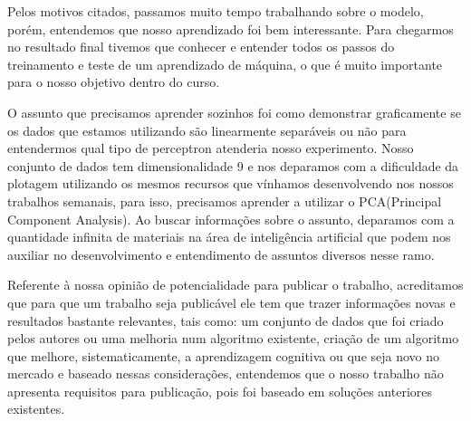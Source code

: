 \documentclass[conference]{IEEEtran}
\begin{document}
  Pelos motivos citados, passamos muito tempo trabalhando sobre o modelo, porém, entendemos que nosso aprendizado foi bem interessante. Para chegarmos no resultado final tivemos que conhecer e entender todos os passos do treinamento e teste de um aprendizado de máquina, o que é muito importante para o nosso objetivo dentro do curso.
 
    
    O assunto que precisamos aprender sozinhos foi como demonstrar graficamente se os dados que estamos utilizando são linearmente separáveis ou não para entendermos qual tipo de perceptron atenderia nosso experimento. Nosso conjunto de dados tem dimensionalidade 9 e nos deparamos com a dificuldade da plotagem utilizando os mesmos recursos que vínhamos desenvolvendo nos nossos trabalhos semanais, para isso, precisamos aprender a utilizar o PCA(Principal Component Analysis). Ao buscar informações sobre o assunto, deparamos com a quantidade infinita de materiais na área de inteligência artificial que podem nos auxiliar no desenvolvimento e entendimento de assuntos diversos nesse ramo.
    
    Referente à nossa opinião de potencialidade para publicar o trabalho, acreditamos que para que um trabalho seja publicável ele tem que trazer informações novas e resultados bastante relevantes, tais como: um conjunto de dados que foi criado pelos autores ou uma melhoria num algoritmo existente, criação de um algoritmo que melhore, sistematicamente, a aprendizagem cognitiva ou que seja novo no mercado e baseado nessas considerações, entendemos que o nosso trabalho não apresenta requisitos para publicação, pois foi baseado em soluções anteriores existentes.
    
\end{document}
